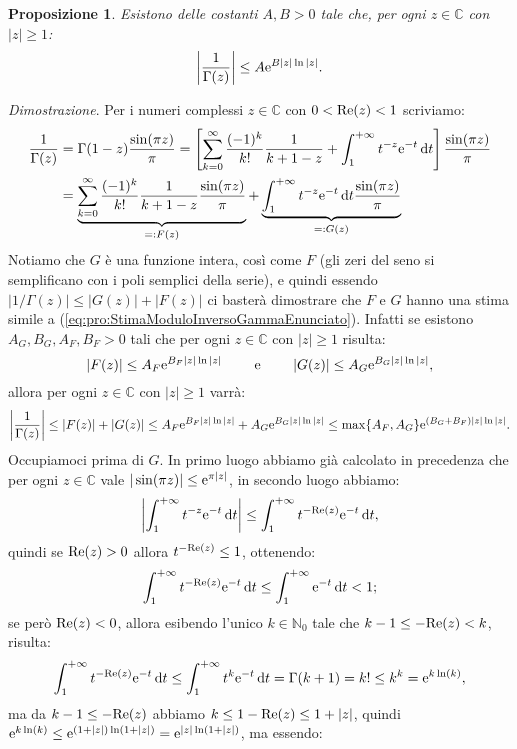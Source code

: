 \documentclass[11pt]{book}
\makeatletter
\theoremstyle{Definizione}
\theoremstyle{TeoremaProposizioneLemmaCorollarioCongettura}
\newtheorem{mypropo}[myteo]{Proposizione}
\theoremstyle{OsservazioneNotaEsempio}
\renewenvironment{proof}[1][\proofname]{\par
  \normalfont \topsep6\p@\@plus6\p@\relax
  \trivlist
  \item[\hskip\labelsep
        \itshape
    #1\@addpunct{.}]\ignorespaces
}{%
  \endtrivlist\@endpefalse
}
\renewenvironment{proof}{\textsl{Dimostrazione}.}{}
\newcommand{\N}{\mathbb{N}}
\newcommand{\C}{\mathbb{C}}
\renewcommand{\Re}{\textup{Re}}
\newcommand{\e}{\textup{e}}
\renewcommand{\d}{\mathrm{d}}
\newcommand{\dt}{\,\d t}
\makeatother
\begin{document}
\begin{boxpro}
\begin{mypropo}\label{pro:StimaModuloInversoGamma}
Esistono delle costanti $A,B > 0$ tale che, per ogni $z\in \C$ con $|z| \geq 1$:
\begin{equation}\label{eq:pro:StimaModuloInversoGammaEnunciato}
\left|\frac{1}{\Gamma(z)}\right| \leq A \e^{B|z|\ln|z|}.
\end{equation}
\end{mypropo}
\tcblower
\begin{proof}
Per i numeri complessi $z\in \C$ con $0<\Re(z)<1$ scriviamo:
\begin{align*}
\frac{1}{\Gamma(z)} &= \Gamma(1-z) \frac{\sin(\pi z)}{\pi} = \left[\sum_{k = 0}^\infty \frac{(-1)^k}{k!}\frac{1}{k+1-z}+\int_{1}^{+\infty} t^{-z}\e^{-t}\dt\right]\frac{\sin(\pi z)}{\pi} \\
&= \underbrace{\sum_{k = 0}^\infty \frac{(-1)^k}{k!}\frac{1}{k+1-z}\frac{\sin(\pi z)}{\pi}}_{=: F(z)} + \underbrace{\int_{1}^{+\infty} t^{-z}\e^{-t}\dt \frac{\sin(\pi z)}{\pi}}_{=: G(z)}
\end{align*}
Notiamo che $G$ è una funzione intera, così come $F$ (gli zeri del seno si semplificano con i poli semplici della serie), e quindi essendo $|1/\Gamma(z)| \leq |G(z)|+|F(z)|$ ci basterà dimostrare che $F$ e $G$ hanno una stima simile a (\ref{eq:pro:StimaModuloInversoGammaEnunciato}). Infatti se esistono $A_G,B_G,A_F,B_F > 0$ tali che per ogni $z\in \C$ con $|z|\geq 1$ risulta:
$$
|F(z)| \leq A_F\e^{B_F|z|\ln|z|}\qquad \textup{ e }\qquad|G(z)| \leq A_G \e^{B_G|z|\ln|z|},
$$
allora per ogni $z\in \C$ con $|z| \geq 1$ varrà:
$$
\left|\frac{1}{\Gamma(z)}\right| \leq |F(z)|+|G(z)| \leq A_F\e^{B_F|z|\ln|z|}+A_G\e^{B_G|z|\ln|z|} \leq \max\{A_F,A_G\} \e^{(B_G+B_F)|z|\ln|z|}.
$$
Occupiamoci prima di $G$. In primo luogo abbiamo già calcolato in precedenza che per ogni $z\in \C$ vale $|\sin(\pi z)| \leq \e^{\pi |z|}$, in secondo luogo abbiamo:
$$
\left|\int_{1}^{+\infty} t^{-z}\e^{-t}\dt\right| \leq \int_{1}^{+\infty} t^{-\Re(z)}\e^{-t}\dt,
$$
quindi se $\Re(z) > 0$ allora $t^{-\Re(z)} \leq 1$, ottenendo:
$$
\int_{1}^{+\infty} t^{-\Re(z)}\e^{-t}\dt \leq \int_{1}^{+\infty} \e^{-t}\dt < 1;
$$
se però $\Re(z) < 0$, allora esibendo l'unico $k\in \N_0$ tale che $k-1 \leq -\Re(z)< k$, risulta:
$$
\int_{1}^{+\infty} t^{-\Re(z)} \e^{-t}\dt \leq \int_{1}^{+\infty}t^{k}\e^{-t}\dt = \Gamma(k+1) = k! \leq k^k = \e^{k\ln(k)},
$$
ma da $k-1\leq -\Re(z)$ abbiamo $k \leq 1-\Re(z)\leq 1+|z|$, quindi $\e^{k\ln(k)} \leq \e^{(1+|z|)\ln(1+|z|)} = \e^{|z|\ln(1+|z|)}$, ma essendo:

\end{proof}
\end{boxpro}
\end{document}
